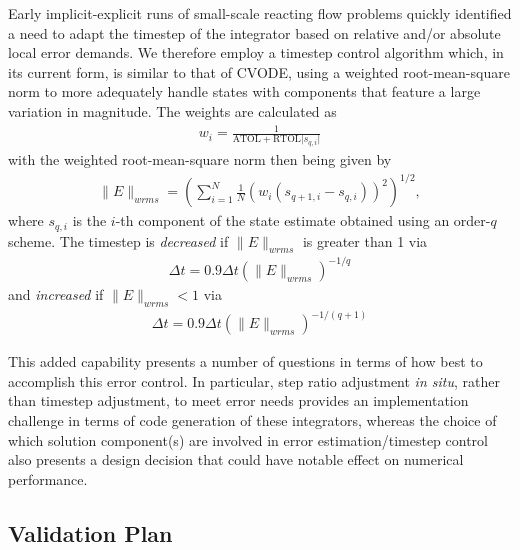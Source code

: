 Early implicit-explicit runs of small-scale reacting flow problems
quickly identified a need to adapt the timestep of the integrator based
on relative and/or absolute local error demands. We therefore employ a
timestep control algorithm which, in its current form, is similar to that of CVODE,
using a weighted root-mean-square norm to more adequately handle states with
components that feature a large variation in magnitude. The weights are calculated as
\begin{align}
w_{i} = \frac{1}{\text{ATOL} + \text{RTOL} \lvert s_{q,i} \rvert}
\end{align}
with the weighted root-mean-square norm then being given by
\begin{align}
\|E\|_{wrms} = \left(\sum_{i=1}^{N} \frac{1}{N} (w_{i}(s_{q+1,i} - s_{q,i}))^2 \right)^{1/2},
\end{align}
where $s_{q,i}$ is the $i$-th component of the state estimate obtained using an order-$q$ scheme.
The timestep is \emph{decreased} if $\|E\|_{wrms}$ is greater than 1 via
\begin{align}
\Delta t = 0.9\Delta t (\|E\|_{wrms})^{-1/q}
\end{align}
and \emph{increased} if $\|E\|_{wrms}<1$ via
\begin{align}
\Delta t = 0.9\Delta t (\|E\|_{wrms})^{-1/(q+1)}
\end{align}

This added capability presents a number of
questions in terms of how best to accomplish this error control. In particular,
step ratio adjustment \emph{in situ}, rather than timestep adjustment, to meet error
needs provides an implementation challenge in terms of code generation of these
integrators, whereas the choice of which solution component(s) are involved in error
estimation/timestep control also presents a design decision that could have notable
effect on numerical performance.

\subsection{Validation Plan}

